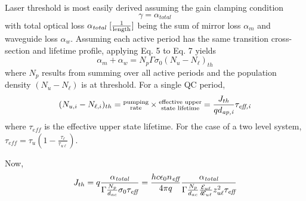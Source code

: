 \documentclass[12pt]{report}
\begin{document}
Laser threshold is most easily derived assuming the gain clamping condition
\begin{equation}
\gamma = \alpha_\textit{total}
\end{equation}
with total optical loss $\alpha_\textit{total}~[\frac{1}{\textnormal{length}}]$ being the sum of mirror loss $\alpha_m$ and waveguide loss $\alpha_w$.  Assuming each active period has the same transition cross-section and lifetime profile, applying Eq. 5 to Eq. 7 yields
\begin{equation}
\alpha_m + \alpha_w = N_p \Gamma \sigma_0 (N_{u}-N_{\ell})_{th}
\end{equation}
where $N_p$ results from summing over all active periods and the population density $(N_{u}-N_{\ell})$ is at threshold.  For a single QC period,
\begin{equation}
(N_{u,i}-N_{\ell,i})_{th} = \begin{subarray}{c}\textnormal{pumping}\\\textnormal{rate}\end{subarray} \times \begin{subarray}{c}\textnormal{effective upper}\\\textnormal{state lifetime}\end{subarray}
= \frac{J_{th}}{q d_\textit{ap,i}} \tau_\textit{eff,i}
\end{equation}
where $\tau_\textit{eff}$ is the effective upper state lifetime.  For the case of a two level system, $\tau_\textit{eff}=\tau_u \left(1-\frac{\tau_\ell}{\tau_{u\ell}}\right)$.

Now,
\begin{equation}
J_{th} = q \frac{\alpha_\textit{total}}{ \Gamma \frac{N_p}{d_{ac}} \sigma_0 \tau_\textit{eff}} = \frac{h c \epsilon_0 n_\textit{eff}}{4 \pi q} \frac{\alpha_\textit{total}}{ \Gamma \frac{N_p}{d_{ac}} \frac{\EE_{u\ell}}{\delta\!\EE_{u\ell}} z_{u\ell}^2 \tau_\textit{eff} }
\end{equation}
\end{document}

